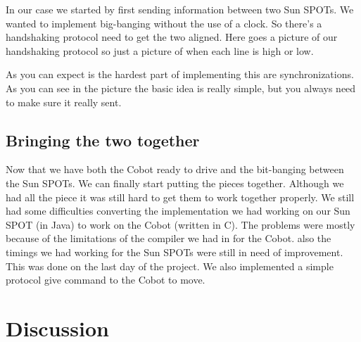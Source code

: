 \documentclass[a4paper,10pt]{article} %
\begin{document}
In our case we started by first sending information between two Sun SPOTs. We
wanted to implement big-banging without the use of a clock. So there's a
handshaking protocol need to get the two aligned. Here goes a picture of our
handshaking protocol so just a picture of when each line is high or low.

As you can expect is the hardest part of implementing this are synchronizations.
As you can see in the picture the basic idea is really simple, but you always
need to make sure it really sent.



\subsection{Bringing the two together} %
\label{subsec:together}

Now that we have both the Cobot ready to drive and the bit-banging between the
Sun SPOTs. We can finally start putting the pieces together. Although we had all
the piece it was still hard to get them to work together properly. We still had
some difficulties converting the implementation we had working on our Sun SPOT
(in Java) to work on the Cobot (written in C). The problems were mostly because
of the limitations of the compiler we had in for the Cobot. also the timings we
had working for the Sun SPOTs were still in need of improvement. This was done on
the last day of the project. We also implemented a simple protocol give command
to the Cobot to move.



\section{Discussion} %
\end{document}
